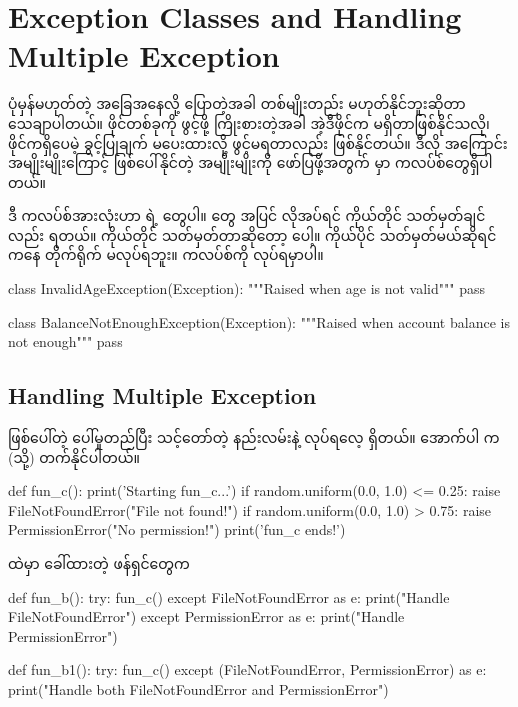 \section{Exception Classes and Handling Multiple Exception}
ပုံမှန်မဟုတ်တဲ့ အခြေအနေလို့ ပြောတဲ့အခါ တစ်မျိုးတည်း မဟုတ်နိုင်ဘူးဆိုတာ သေချာပါတယ်။ ဖိုင်တစ်ခုကို ဖွင့်ဖို့ ကြိုးစားတဲ့အခါ အဲ့ဒီဖိုင်က မရှိတာဖြစ်နိုင်သလို၊ ဖိုင်ကရှိပေမဲ့ ခွင့်ပြုချက်  မပေးထားလို့ ဖွင့်မရတာလည်း ဖြစ်နိုင်တယ်။ ဒီလို အကြောင်း အမျိုးမျိုးကြောင့် ဖြစ်ပေါ်နိုင်တဲ့  အမျိုးမျိုးကို ဖော်ပြဖို့အတွက်  မှာ   ကလပ်စ်တွေရှိပါတယ်။ 

ဒီ  ကလပ်စ်အားလုံးဟာ  ရဲ့  တွေပါ။    တွေ အပြင် လိုအပ်ရင် ကိုယ်တိုင် သတ်မှတ်ချင်လည်း ရတယ်။ ကိုယ်တိုင် သတ်မှတ်တာဆိုတော့  ပေါ့။ ကိုယ်ပိုင် သတ်မှတ်မယ်ဆိုရင်  ကနေ  တိုက်ရိုက်  မလုပ်ရဘူး။  ကလပ်စ်ကို  လုပ်ရမှာပါ။ 

%
\begin{py}
class InvalidAgeException(Exception):
    """Raised when age is not valid"""
    pass
\end{py}
\begin{py}
class BalanceNotEnoughException(Exception):
    """Raised when account balance is not enough"""
    pass
\end{py}
%

\subsection*{Handling Multiple Exception}
ဖြစ်ပေါ်တဲ့  ပေါ်မူတည်ပြီး သင့်တော်တဲ့ နည်းလမ်းနဲ့  လုပ်ရလေ့ ရှိတယ်။ အောက်ပါ  က  (သို့)  တက်နိုင်ပါတယ်။
%
\begin{py}
def fun_c():
    print('Starting fun_c...')
    if random.uniform(0.0, 1.0) <= 0.25:
        raise FileNotFoundError("File not found!")
    if random.uniform(0.0, 1.0) > 0.75:
        raise PermissionError("No permission!")
    print('fun_c ends!')
\end{py}
%
 ထဲမှာ ခေါ်ထားတဲ့ ဖန်ရှင်တွေက 

%
\begin{py}
def fun_b():
    try:
        fun_c()
    except FileNotFoundError as e:
        print("Handle FileNotFoundError")
    except PermissionError as e:
        print("Handle PermissionError")
\end{py}
%
%
\begin{py}
def fun_b1():
    try:
        fun_c()
    except (FileNotFoundError, PermissionError) as e:
        print("Handle both FileNotFoundError and PermissionError")
\end{py}
%


